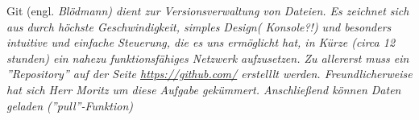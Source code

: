 Git (engl. \it{Blödmann}) dient zur Versionsverwaltung von Dateien.
Es zeichnet sich aus durch höchste Geschwindigkeit, simples Design( Konsole?!) und
besonders intuitive und einfache Steuerung, die es uns ermöglicht hat, in Kürze (circa 12 stunden) 
ein nahezu funktionsfähiges Netzwerk aufzusetzen.
Zu allererst muss ein ''Repository'' auf der Seite \url{https://github.com/} erstelllt werden. Freundlicherweise hat sich
Herr Moritz um diese Aufgabe gekümmert.
Anschließend können Daten geladen (''pull''-Funktion) 
